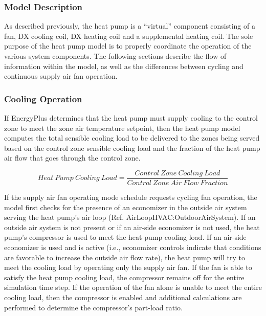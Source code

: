 \subsubsection{Model Description}\label{model-description-3}

As described previously, the heat pump is a ``virtual'' component consisting of a fan, DX cooling coil, DX heating coil and a supplemental heating coil. The sole purpose of the heat pump model is to properly coordinate the operation of the various system components. The following sections describe the flow of information within the model, as well as the differences between cycling and continuous supply air fan operation.

\subsubsection{Cooling Operation}\label{cooling-operation-1}

If EnergyPlus determines that the heat pump must supply cooling to the control zone to meet the zone air temperature setpoint, then the heat pump model computes the total sensible cooling load to be delivered to the zones being served based on the control zone sensible cooling load and the fraction of the heat pump air flow that goes through the control zone.

\begin{equation}
Heat~Pump~Cooling~Load = \frac{{Control~Zone~Cooling~Load}}{{Control~Zone~Air~Flow~Fraction}}
\end{equation}

If the supply air fan operating mode schedule requests cycling fan operation, the model first checks for the presence of an economizer in the outside air system serving the heat pump's air loop (Ref. AirLoopHVAC:OutdoorAirSystem). If an outside air system is not present or if an air-side economizer is not used, the heat pump's compressor is used to meet the heat pump cooling load. If an air-side economizer is used and is active (i.e., economizer controls indicate that conditions are favorable to increase the outside air flow rate), the heat pump will try to meet the cooling load by operating only the supply air fan. If the fan is able to satisfy the heat pump cooling load, the compressor remains off for the entire simulation time step. If the operation of the fan alone is unable to meet the entire cooling load, then the compressor is enabled and additional calculations are performed to determine the compressor's part-load ratio.

